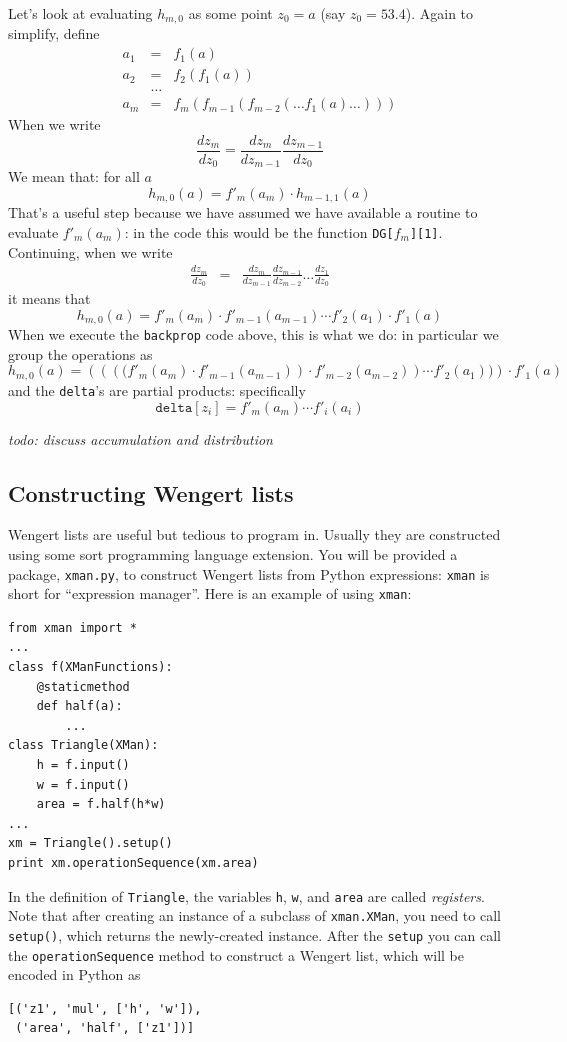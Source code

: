 \documentclass[12pt]{article}
\newcommand{\wc}[1]{\textit{todo: #1}}
\newcommand{\cd}[1]{\texttt{#1}}
\newcommand{\trm}[1]{\textit{#1}}
\newcommand{\deriv}[2]{\frac{d{}#1}{d{}#2}}
\begin{document}
Let's look at evaluating $h_{m,0}$ as some point $z_0=a$ (say
$z_0=53.4$). Again to simplify, define
\begin{eqnarray*}
a_1 & = & f_1(a) \\
a_2 & = & f_2(f_1(a)) \\
 & \ldots & \\
a_m & = & f_{m}(f_{m-1}(f_{m-2}(\ldots f_1(a) \ldots)))
\end{eqnarray*}
When we write
\[
\deriv{z_m}{z_0}  =  \deriv{z_m}{z_{m-1}} \deriv{z_{m-1}}{z_0}
\]
We mean that: for all $a$
\[
h_{m,0}(a) = f'_{m}(a_m) \cdot h_{m-1,1}(a)
\]
That's a useful step because we have assumed we have available a
routine to evaluate $f'_{m}(a_m)$: in the code this would be the
function \cd{DG[$f_m$][1]}.  Continuing, when we write
\begin{eqnarray*}
\deriv{z_m}{z_0} & = & \deriv{z_m}{z_{m-1}} \deriv{z_{m-1}}{z_{m-2}} \ldots \deriv{z_{1}}{z_{0}}
\end{eqnarray*}
it means that 
\[
h_{m,0}(a) = f'_{m}(a_m) \cdot f'_{m-1}(a_{m-1})\cdots f'_{2}(a_1) \cdot f'_{1}(a)
\]
When we execute the \cd{backprop} code above, this is what we do: in particular we
group the operations as 
\[
h_{m,0}(a) = \left(\left(\left( (f'_{m}(a_m) \cdot f'_{m-1}(a_{m-1}) \right) \cdot f'_{m-2}(a_{m-2})\right) \cdots f'_{2}(a_1)) \right) \cdot f'_{1}(a)
\]
and the \cd{delta}'s
are partial products: specifically 
\[ \cd{delta}[z_i] = f'_{m}(a_m) \cdots f'_{i}(a_{i})
\]

\wc{discuss accumulation and distribution}

\subsection{Constructing Wengert lists}

Wengert lists are useful but tedious to program in.  Usually they are
constructed using some sort programming language extension.  You will
be provided a package, \cd{xman.py}, to construct Wengert lists from
Python expressions: \cd{xman} is short for ``expression manager''.
Here is an example of using \cd{xman}:

\begin{verbatim}
from xman import *
...
class f(XManFunctions):
    @staticmethod 
    def half(a): 
        ...
class Triangle(XMan):
    h = f.input()
    w = f.input()
    area = f.half(h*w)
...
xm = Triangle().setup()
print xm.operationSequence(xm.area)
\end{verbatim}
In the definition of \cd{Triangle}, the variables \cd{h}, \cd{w}, and
\cd{area} are called \trm{registers}.  Note that after creating an
instance of a subclass of \cd{xman.XMan}, you need to call
\cd{setup()}, which returns the newly-created instance.  After the
\cd{setup} you can call the \cd{operationSequence} method to construct
a Wengert list, which will be encoded in Python as
\begin{verbatim}
[('z1', 'mul', ['h', 'w']), 
 ('area', 'half', ['z1'])]
\end{verbatim}
\end{document}
